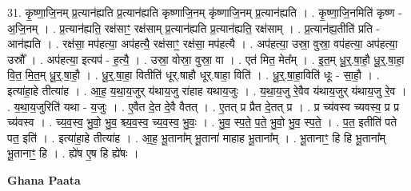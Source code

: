 \documentclass[17pt]{extarticle}
\begin{document}
31. कृ॒ष्णा॒जि॒नम् प्र॒त्यान॑ह्यति प्र॒त्यान॑ह्यति कृष्णाजि॒नम् कृ॑ष्णाजि॒नम् प्र॒त्यान॑ह्यति । . कृ॒ष्णा॒जि॒नमिति॑ कृष्ण - अ॒जि॒नम् । . प्र॒त्यान॑ह्यति॒ रक्ष॑साꣳ॒॒ रक्ष॑साम् प्र॒त्यान॑ह्यति प्र॒त्यान॑ह्यति॒ रक्ष॑साम् । . प्र॒त्यान॑ह्य॒तीति॑ प्रति - आन॑ह्यति । . रक्ष॑सा॒ मप॑हत्या॒ अप॑हत्यै॒ रक्ष॑साꣳ॒॒ रक्ष॑सा॒ मप॑हत्यै । . अप॑हत्या॒ उस्रा॒ वुस्रा॒ वप॑हत्या॒ अप॑हत्या॒ उस्रौ᳚ । . अप॑हत्या॒ इत्यप॑ - ह॒त्यै॒ । . उस्रा॒ वोस्रा॒ वुस्रा॒ वा । . एत॑ मित॒ मेत᳚म् । . इ॒त॒म् धू॒र्॒.षा॒हौ॒ धू॒र्॒.षा॒हा॒ वि॒त॒ मि॒त॒म् धू॒र्॒.षा॒हौ॒ । . धू॒र्॒.षा॒हा॒ वितीति॑ धूर्.षाहौ धूर्.षाहा॒ विति॑ । . धू॒र्॒.षा॒हा॒विति॑ धूः - सा॒हौ॒ । . इत्या॑हा॒हे तीत्या॑ह । . आ॒ह॒ य॒था॒य॒जुर् य॑थाय॒जु रा॑हाह यथाय॒जुः । . य॒था॒य॒जु रे॒वैव य॑थाय॒जुर् य॑थाय॒जु रे॒व । . य॒था॒य॒जुरिति॑ यथा - य॒जुः । . ए॒वैत दे॒त दे॒वै वैतत् । . ए॒तत् प्र प्रैत दे॒तत् प्र । . प्र च्य॑वस्व च्यवस्व॒ प्र प्र च्य॑वस्व । . च्य॒व॒स्व॒ भु॒वो॒ भु॒व॒ श्च्य॒व॒स्व॒ च्य॒व॒स्व॒ भु॒वः॒ । . भु॒व॒ स्प॒ते॒ प॒ते॒ भु॒वो॒ भु॒व॒ स्प॒ते॒ । . प॒त॒ इतीति॑ पते पत॒ इति॑ । . इत्या॑हा॒हे तीत्या॑ह । . आ॒ह॒ भू॒ताना᳚म् भू॒ताना॑ माहाह भू॒ताना᳚म् । . भू॒तानाꣳ॒॒ हि हि भू॒ताना᳚म् भू॒तानाꣳ॒॒ हि । . ह्ये॑ष ए॒ष हि ह्ये॑षः । \newline

\textbf{Ghana Paata } \newline
\end{document}

